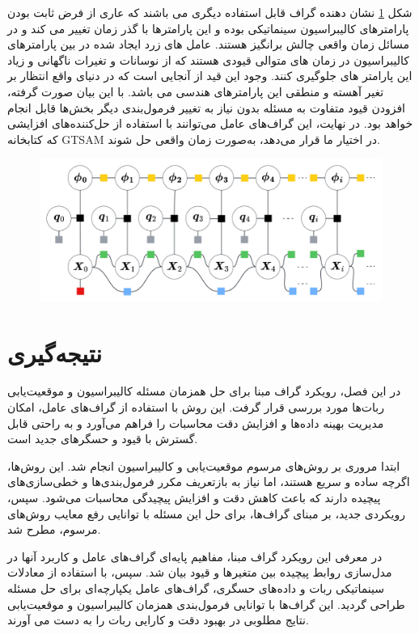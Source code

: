 شکل 
\ref{fig:kinematiclocalizationbasicnonstationatyparam}
نشان دهنده گراف قابل استفاده دیگری می باشند که عاری از فرض ثابت بودن پارامترهای کالیبراسیون سینماتیکی بوده و این پارامترها با گذر زمان تغییر می کند و در مسائل زمان واقعی چالش برانگیز هستند. عامل های زرد ایجاد شده در بین پارامترهای کالیبراسیون در زمان های متوالی قیودی هستند که از نوسانات و تغیرات ناگهانی و زیاد این پارامتر های جلوگیری کنند. وجود این قید از آنجایی است که در دنیای واقع انتظار بر تغیر آهسته و منطقی این پارامترهای هندسی می باشد. 
با این بیان صورت گرفته، افزودن قیود متفاوت به مسئله بدون نیاز به تغییر فرمول‌بندی دیگر بخش‌ها قابل انجام خواهد بود. در نهایت، این گراف‌های عامل می‌توانند با استفاده از حل‌کننده‌های افزایشی که کتابخانه GTSAM در اختیار ما قرار می‌دهد، به‌صورت زمان واقعی حل شوند. 

\begin{figure}[b]
	\centering
	\includegraphics[width=0.7\linewidth]{img/Kinematic_localization_basic_nonstationaty_param}
	\caption{}
	\label{fig:kinematiclocalizationbasicnonstationatyparam}
\end{figure}


\section{نتیجه‌گیری}

در این فصل، رویکرد گراف مبنا برای حل همزمان مسئله کالیبراسیون و موقعیت‌یابی ربات‌ها مورد بررسی قرار گرفت. این روش با استفاده از گراف‌های عامل، امکان مدیریت بهینه داده‌ها و افزایش دقت محاسبات را فراهم می‌آورد و به راحتی قابل گسترش با قیود و حسگرهای جدید است.

ابتدا مروری بر روش‌های مرسوم موقعیت‌یابی و کالیبراسیون انجام شد. این روش‌ها، اگرچه ساده و سریع هستند، اما نیاز به بازتعریف مکرر فرمول‌بندی‌ها و خطی‌سازی‌های پیچیده دارند که باعث کاهش دقت و افزایش پیچیدگی محاسبات می‌شود. سپس، رویکردی جدید، بر مبنای گراف‌ها، برای حل این مسئله با توانایی رفع معایب روش‌های مرسوم، مطرح شد.

در معرفی این رویکرد گراف مبنا، مفاهیم پایه‌ای گراف‌های عامل و کاربرد آنها در مدل‌سازی روابط پیچیده بین متغیرها و قیود بیان شد. سپس، با استفاده از معادلات سینماتیکی ربات و داده‌های حسگری، گراف‌های عامل یکپارچه‌ای برای حل مسئله طراحی گردید. این گراف‌ها با توانایی فرمول‌بندی همزمان کالیبراسیون و موقعیت‌یابی نتایج مطلوبی در بهبود دقت و کارایی ربات را به دست می آورند.



 
 
 
 